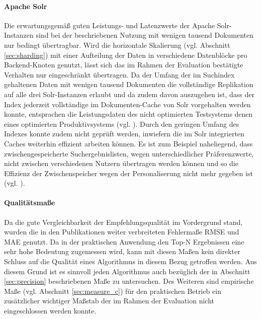 \paragraph{Apache Solr} Die erwartungsgemäß guten Leistungs- und Latenzwerte der Apache Solr-Instanzen sind bei der beschriebenen Nutzung mit wenigen tausend Dokumenten nur bedingt übertragbar. Wird die horizontale Skalierung (vgl. Abschnitt \ref{sec:sharding}) mit einer Aufteilung der Daten in verschiedene Datenblöcke pro Backend-Knoten genutzt, lässt sich das im Rahmen der Evaluation bestätigte Verhalten nur eingeschränkt übertragen. Da der Umfang der im Suchindex gehaltenen Daten mit wenigen tausend Dokumenten die vollständige Replikation auf alle drei Solr-Instanzen erlaubt und da zudem davon auszugehen ist, dass der Index jederzeit vollständige im Dokumenten-Cache von Solr vorgehalten werden konnte, entsprachen die Leistungsdaten des nicht optimierten Testsystems denen eines optimierten Produktivsystems (vgl. \citep{Rappold2013}).  Durch den geringen Umfang des Indexes konnte zudem nicht geprüft werden, inwiefern die im Solr integrierten Caches weiterhin effizient arbeiten können. Es ist zum Beispiel naheliegend, dass zwischengespeicherte Suchergebnislisten, wegen unterschiedlicher Präferenzwerte, nicht zwischen verschiedenen Nutzern übertragen werden können und so die Effizienz der Zwischenspeicher wegen der Personaliserung nicht mehr gegeben ist (vgl. \citep{solrcache}). 

\paragraph{Qualitätsmaße} Da die gute Vergleichbarkeit der Empfehlungsqualität im Vordergrund stand, wurden die in den Publikationen weiter verbreiteten Fehlermaße \acs{RMSE} und \acs{MAE} genutzt. Da in der praktischen Anwendung den Top-N Ergebnissen eine sehr hohe Bedeutung zugemessen wird, kann mit diesen Maßen kein direkter Schluss auf die Qualität eines Algorithmus in diesem Bezug getroffen werden. Aus diesem Grund ist es sinnvoll jeden Algorithmus auch bezüglich der in Abschnitt \ref{sec:precision} beschriebenen Maße zu untersuchen. Des Weiteren sind empirische Maße (vgl. Abschnitt \ref{sec:measure_c}) für den praktischen Betrieb ein zusätzlicher wichtiger Maßstab der im Rahmen der Evaluation nicht eingeschlossen werden konnte. \citep{Cremonesi:2010:PRA:1864708.1864721}

